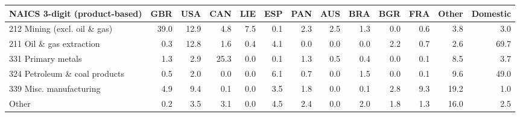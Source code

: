 \begin{tabular}{lrrrrrrrrrrrr}
\toprule
NAICS 3-digit (product-based) & GBR & USA & CAN & LIE & ESP & PAN & AUS & BRA & BGR & FRA & Other & Domestic \\
\midrule
212 Mining (excl. oil \& gas) & 39.0 & 12.9 & 4.8 & 7.5 & 0.1 & 2.3 & 2.5 & 1.3 & 0.0 & 0.6 & 3.8 & 3.0 \\
211 Oil \& gas extraction & 0.3 & 12.8 & 1.6 & 0.4 & 4.1 & 0.0 & 0.0 & 0.0 & 2.2 & 0.7 & 2.6 & 69.7 \\
331 Primary metals & 1.3 & 2.9 & 25.3 & 0.0 & 0.1 & 1.3 & 0.5 & 0.4 & 0.0 & 0.1 & 8.5 & 3.7 \\
324 Petroleum \& coal products & 0.5 & 2.0 & 0.0 & 0.0 & 6.1 & 0.7 & 0.0 & 1.5 & 0.0 & 0.1 & 9.6 & 49.0 \\
339 Misc. manufacturing & 4.9 & 9.4 & 0.1 & 0.0 & 3.5 & 1.8 & 0.0 & 0.1 & 2.8 & 9.3 & 19.2 & 1.0 \\
Other & 0.2 & 3.5 & 3.1 & 0.0 & 4.5 & 2.4 & 0.0 & 2.0 & 1.8 & 1.3 & 16.0 & 2.5 \\
\bottomrule
\end{tabular}

